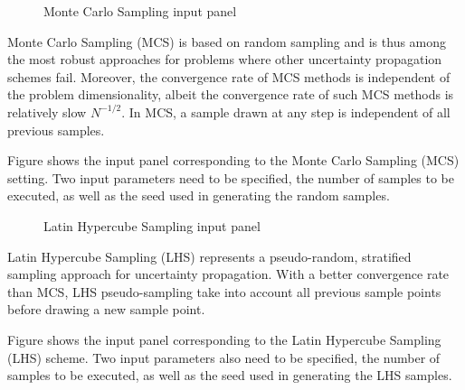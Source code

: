\begin{figure}[!htbp]
  \caption{Monte Carlo Sampling input panel}
  \label{fig:mcs}
\end{figure}

Monte Carlo Sampling (MCS) is based on random sampling and is thus among the most robust approaches for problems where other uncertainty propagation schemes fail. Moreover, the convergence rate of MCS methods is independent of the problem dimensionality, albeit the convergence rate of such MCS methods is relatively slow $N^{-1/2}$. In MCS, a sample drawn at any step is independent of all previous samples. 

Figure  shows the input panel corresponding to the Monte Carlo Sampling (MCS) setting. Two input parameters need to be specified, the number of samples to be executed, as well as the seed used in generating the random samples. 


\begin{figure}[!htbp]
  \caption{Latin Hypercube Sampling input panel}
  \label{fig:lhs}
\end{figure}

Latin Hypercube Sampling (LHS) represents a pseudo-random, stratified sampling approach for uncertainty propagation. With a better convergence rate than MCS, LHS pseudo-sampling take into account all previous sample points before drawing a new sample point.  

Figure  shows the input panel corresponding to the Latin Hypercube Sampling (LHS) scheme. Two input parameters also need to be specified, the number of samples to be executed, as well as the seed used in generating the LHS samples. 

